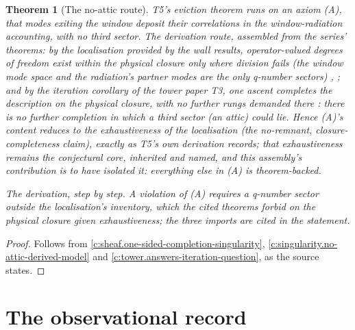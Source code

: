 \documentclass[11pt]{article}
\newtheorem{theorem}{Theorem}[section]
\theoremstyle{definition}
\theoremstyle{plain}
\begin{document}
\begin{theorem}[The no-attic route]\label{c:scrambling.no-attic-route}
T5's eviction theorem runs on an axiom (A), that modes exiting the window deposit their correlations in the window-radiation accounting, with no third sector. The derivation route, assembled from the series' theorems: by the localisation provided by the wall results, operator-valued degrees of freedom exist within the physical closure only where division fails (the window mode space and the radiation's partner modes are the only q-number sectors) \cite[\S 5 and \S 8]{ButlerT4}, \cite[\S 10--11]{ButlerT5}; and by the iteration corollary of the tower paper T3, one ascent completes the description on the physical closure, with no further rungs demanded there \cite[Cor.~6.2]{ButlerT3}: there is no further completion in which a third sector (an attic) could lie. Hence (A)'s content reduces to the \emph{exhaustiveness} of the localisation (the no-remnant, closure-completeness claim), exactly as T5's own derivation records; that exhaustiveness remains the conjectural core, inherited and named, and this assembly's contribution is to have isolated it: everything else in (A) is theorem-backed.

\smallskip
\noindent\emph{The derivation, step by step.} A violation of (A) requires a q-number sector outside the localisation's inventory, which the cited theorems forbid on the physical closure given exhaustiveness; the three imports are cited in the statement.
\end{theorem}
\begin{proof}
Follows from \ref{c:sheaf.one-sided-completion-singularity}, \ref{c:singularity.no-attic-derived-model} and \ref{c:tower.answers-iteration-question}, as the source states.

\end{proof}

\section{The observational record}
\end{document}
